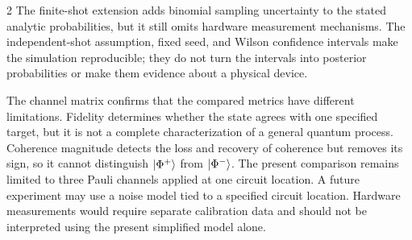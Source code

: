\documentclass[a4paper,10pt]{article}
\begin{document}
\begin{multicols}{2}
The finite-shot extension adds binomial sampling uncertainty to the stated
analytic probabilities, but it still omits hardware measurement mechanisms.
The independent-shot assumption, fixed seed, and Wilson confidence intervals
make the simulation reproducible; they do not turn the intervals into posterior
probabilities or make them evidence about a physical device.

The channel matrix confirms that the compared metrics have different
limitations. Fidelity determines
whether the state agrees with one specified target, but it is not a complete
characterization of a general quantum process.  Coherence magnitude detects
the loss and recovery of coherence but removes its sign, so it cannot
distinguish $\ket{\Phi^+}$ from $\ket{\Phi^-}$. The present comparison remains
limited to three Pauli channels applied at one circuit location. A future
experiment may use a noise model tied to a specified circuit location. Hardware measurements
would require separate calibration data and should not be interpreted using
the present simplified model alone.

\end{multicols}



\end{document}
